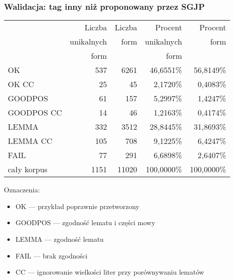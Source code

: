 \documentclass{beamer}
\begin{document}
\begin{frame}
\frametitle{Walidacja: tag inny niż proponowany przez SGJP}
\begin{center}\begin{scriptsize}
\begin{tabular}{l|rrrr}
 & Liczba & Liczba & Procent & Procent\\
 & unikalnych & form & unikalnych & form\\
 & form & & form & \\
\hline
OK & 537 & 6261 & 46,6551\% & 56,8149\% \\
OK CC & 25 & 45 & 2,1720\% & 0,4083\% \\
GOODPOS & 61 & 157 & 5,2997\% & 1,4247\% \\
GOODPOS CC & 14 & 46 & 1,2163\% & 0,4174\% \\
LEMMA & 332 & 3512 & 28,8445\% & 31,8693\% \\
LEMMA CC & 105 & 708 & 9,1225\% & 6,4247\% \\
FAIL & 77 & 291 & 6,6898\% & 2,6407\% \\
\hline
cały korpus & 1151 & 11020 & 100,0000\% & 100,0000\%\\
\end{tabular}
\end{scriptsize}\end{center}
Oznaczenia:
\begin{itemize}
\item OK --- przykład poprawnie przetworzony
\item GOODPOS --- zgodność lematu i części mowy
\item LEMMA --- zgodność lematu
\item FAIL --- brak zgodności
\item CC --- ignorowanie wielkości liter przy porównywaniu lematów
\end{itemize}

\end{frame}
\end{document}
